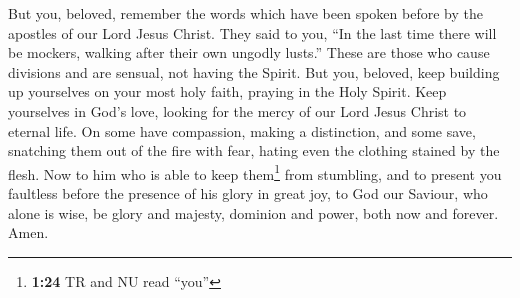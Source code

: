  But you, beloved, remember the words which have been
spoken before by the apostles of our Lord Jesus Christ. 
They said to you, ``In the last time there will be mockers, walking
after their own ungodly lusts.''  These are those who
cause divisions and are sensual, not having the Spirit. 
But you, beloved, keep building up yourselves on your most holy faith,
praying in the Holy Spirit.  Keep yourselves in God's
love, looking for the mercy of our Lord Jesus Christ to eternal life.
 On some have compassion, making a distinction,
 and some save, snatching them out of the fire with fear,
hating even the clothing stained by the flesh.  Now to
him who is able to keep them\footnote{\textbf{1:24} TR and NU read
  ``you''} from stumbling, and to present you faultless before the
presence of his glory in great joy,  to God our Saviour,
who alone is wise, be glory and majesty, dominion and power, both now
and forever. Amen.
